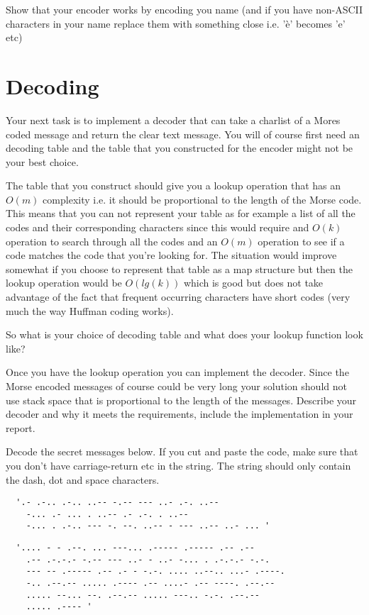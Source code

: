 \documentclass[a4paper,11pt]{article}
\begin{document}
Show that your encoder works by encoding you name (and if you have
non-ASCII characters in your name replace them with something close
i.e. 'è' becomes 'e' etc)

\section{Decoding}

Your next task is to implement a decoder that can take a charlist of a
Mores coded message and return the clear text message. You will of
course first need an decoding table and the table that you constructed
for the encoder might not be your best choice.

The table that you construct should give you a lookup operation that
has an $O(m)$ complexity i.e. it should be proportional to the length
of the Morse code. This means that you can not represent your table as
for example a list of all the codes and their corresponding characters
since this would require and $O(k)$ operation to search through all
the codes and an $O(m)$ operation to see if a code matches the code
that you're looking for. The situation would improve somewhat if you
choose to represent that table as a map structure but then the lookup
operation would be $O(lg(k))$ which is good but does not take
advantage of the fact that frequent occurring characters have short
codes (very much the way Huffman coding works).

So what is your choice of decoding table and what does your lookup
function look like?

Once you have the lookup operation you can implement the
decoder. Since the Morse encoded messages of course could be very long
your solution should not use stack space that is proportional to the
length of the messages. Describe your decoder and why it meets the
requirements, include the implementation in your report.

Decode the secret messages below. If you cut and paste the code, make
sure that you don't have carriage-return etc in the string. The string
should only contain the dash, dot and space characters. 

\begin{verbatim}
  '.- .-.. .-.. ..-- -.-- --- ..- .-. ..-- 
    -... .- ... . ..-- .- .-. . ..-- 
    -... . .-.. --- -. --. ..-- - --- ..-- ..- ... '
\end{verbatim}

\begin{verbatim}
  '.... - - .--. ... ---... .----- .----- .-- .-- 
    .-- .-.-.- -.-- --- ..- - ..- -... . .-.-.- -.-. 
    --- -- .----- .-- .- - -.-. .... ..--.. ...- .----. 
    -.. .--.-- ..... .---- .-- ....- .-- ----. .--.-- 
    ..... --... --. .--.-- ..... ---.. -.-. .--.-- 
    ..... .---- '
\end{verbatim}
\end{document}
